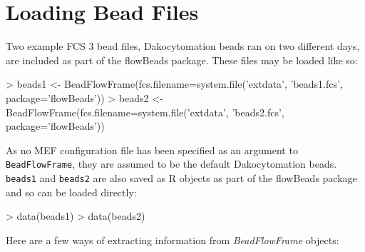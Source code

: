 \documentclass[11pt]{article}
\newcommand{\Rcode}[1]{{\texttt{#1}}}
\newcommand{\Rpackage}[1]{{\textsf{#1}}}
\newcommand{\Rclass}[1]{{\textit{#1}}}
\begin{document}



\section{Loading Bead Files}

Two example FCS 3 bead files, Dakocytomation beads ran on two different days, are included as part of the \Rpackage{flowBeads} package.
These files may be loaded like so:

\begin{Schunk}
\begin{Sinput}
> beads1 <- BeadFlowFrame(fcs.filename=system.file('extdata', 'beads1.fcs', package='flowBeads'))
> beads2 <- BeadFlowFrame(fcs.filename=system.file('extdata', 'beads2.fcs', package='flowBeads'))
\end{Sinput}
\end{Schunk}

\noindent
As no MEF configuration file has been specified as an argument to \Rcode{BeadFlowFrame}, they are assumed to be the default Dakocytomation beads.
\Rcode{beads1} and \Rcode{beads2} are also saved as R objects as part of the \Rpackage{flowBeads} package and so can be loaded directly:

\begin{Schunk}
\begin{Sinput}
> data(beads1)
> data(beads2)
\end{Sinput}
\end{Schunk}

\noindent
Here are a few ways of extracting information from \Rclass{BeadFlowFrame} objects:
\end{document}
